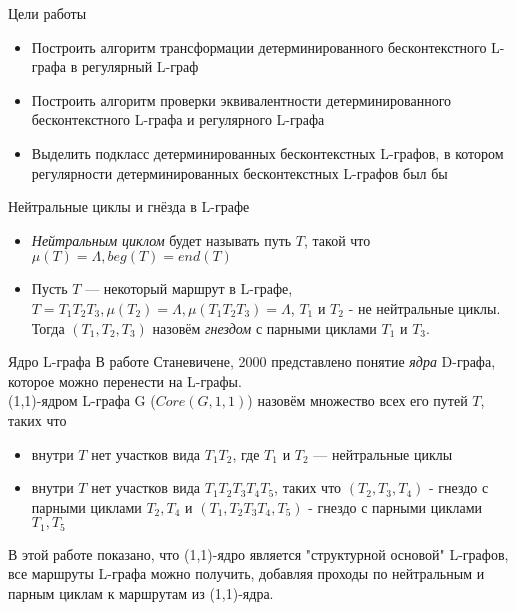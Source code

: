 \documentclass{beamer}
\begin{document}
\begin{frame} {Цели работы}
\begin{itemize}
  \item Построить алгоритм трансформации детерминированного бесконтекстного L-графа в регулярный L-граф
  \item Построить алгоритм проверки эквивалентности детерминированного бесконтекстного L-графа и регулярного L-графа
  \item Выделить подкласс детерминированных бесконтекстных L-графов, в котором   регулярности детерминированных бесконтекстных L-графов был бы 
\end{itemize}
\end{frame}

\begin{frame} {Нейтральные циклы и гнёзда в L-графе}
\begin{itemize}
  \item \textit{Нейтральным циклом} будет называть путь $T$, такой что $\mu(T) = \Lambda, beg(T) = end(T)$\\
  \item Пусть $T$ --- некоторый маршрут в L-графе, $T=T_1T_2T_3, \mu(T_2) = \Lambda, \mu(T_1T_2T_3) = \Lambda$, $T_1$ и $T_2$ - не нейтральные циклы. Тогда $(T_1,T_2,T_3)$ назовём \textit{гнездом} с парными циклами $T_1$ и $T_3$.
\end{itemize}
\end{frame}

\begin{frame}{Ядро L-графа}
В работе Станевичене, 2000 представлено понятие \textit{ядра} D-графа, которое можно перенести на L-графы.\\
\vspace{0.3cm}
(1,1)-ядром L-графа G ($Core(G,1,1)$) назовём множество всех его путей $T$, таких что
\begin{itemize}
  \item внутри $T$ нет участков вида $T_1T_2$, где $T_1 \text{ и } T_2$ --- нейтральные циклы
  \item внутри $T$ нет участков вида $T_1T_2T_3T_4T_5$, таких что $(T_2,T_3,T_4)$ - гнездо с парными циклами $T_2,T_4$ и $(T_1,T_2T_3T_4,T_5)$ - гнездо с парными циклами $T_1,T_5$
\end{itemize}

В этой работе показано, что (1,1)-ядро является "структурной основой"  L-графов, все маршруты L-графа можно получить, добавляя проходы по нейтральным и парным циклам к маршрутам из (1,1)-ядра.
\end{frame}
\end{document}
